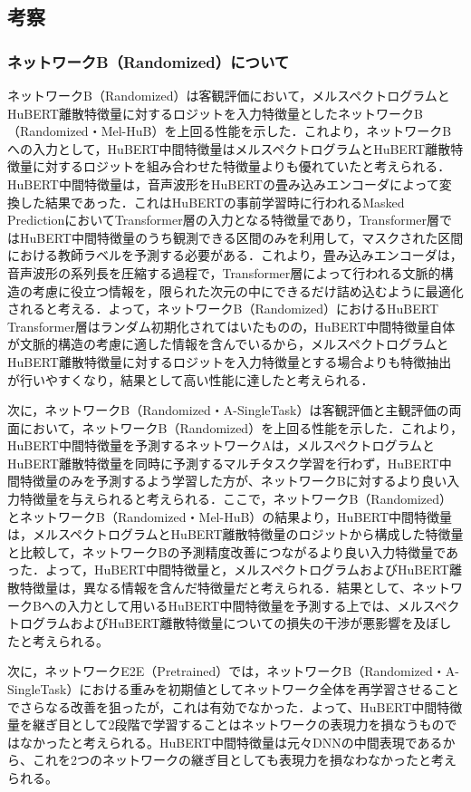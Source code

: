 \subsection{考察}
\subsubsection{ネットワークB（Randomized）について}
\label{sec4:sec:consideration_b_randomized}
ネットワークB（Randomized）は客観評価において，メルスペクトログラムとHuBERT離散特徴量に対するロジットを入力特徴量としたネットワークB（Randomized・Mel-HuB）を上回る性能を示した．これより，ネットワークBへの入力として，HuBERT中間特徴量はメルスペクトログラムとHuBERT離散特徴量に対するロジットを組み合わせた特徴量よりも優れていたと考えられる．HuBERT中間特徴量は，音声波形をHuBERTの畳み込みエンコーダによって変換した結果であった．これはHuBERTの事前学習時に行われるMasked PredictionにおいてTransformer層の入力となる特徴量であり，Transformer層ではHuBERT中間特徴量のうち観測できる区間のみを利用して，マスクされた区間における教師ラベルを予測する必要がある．これより，畳み込みエンコーダは，音声波形の系列長を圧縮する過程で，Transformer層によって行われる文脈的構造の考慮に役立つ情報を，限られた次元の中にできるだけ詰め込むように最適化されると考える．よって，ネットワークB（Randomized）におけるHuBERT Transformer層はランダム初期化されてはいたものの，HuBERT中間特徴量自体が文脈的構造の考慮に適した情報を含んでいるから，メルスペクトログラムとHuBERT離散特徴量に対するロジットを入力特徴量とする場合よりも特徴抽出が行いやすくなり，結果として高い性能に達したと考えられる．

次に，ネットワークB（Randomized・A-SingleTask）は客観評価と主観評価の両面において，ネットワークB（Randomized）を上回る性能を示した．これより，HuBERT中間特徴量を予測するネットワークAは，メルスペクトログラムとHuBERT離散特徴量を同時に予測するマルチタスク学習を行わず，HuBERT中間特徴量のみを予測するよう学習した方が、ネットワークBに対するより良い入力特徴量を与えられると考えられる．ここで，ネットワークB（Randomized）とネットワークB（Randomized・Mel-HuB）の結果より，HuBERT中間特徴量は，メルスペクトログラムとHuBERT離散特徴量のロジットから構成した特徴量と比較して，ネットワークBの予測精度改善につながるより良い入力特徴量であった．よって，HuBERT中間特徴量と，メルスペクトログラムおよびHuBERT離散特徴量は，異なる情報を含んだ特徴量だと考えられる．結果として、ネットワークBへの入力として用いるHuBERT中間特徴量を予測する上では、メルスペクトログラムおよびHuBERT離散特徴量についての損失の干渉が悪影響を及ぼしたと考えられる。

次に，ネットワークE2E（Pretrained）では，ネットワークB（Randomized・A-SingleTask）における重みを初期値としてネットワーク全体を再学習させることでさらなる改善を狙ったが，これは有効でなかった．よって、HuBERT中間特徴量を継ぎ目として2段階で学習することはネットワークの表現力を損なうものではなかったと考えられる。HuBERT中間特徴量は元々DNNの中間表現であるから、これを2つのネットワークの継ぎ目としても表現力を損なわなかったと考えられる。

